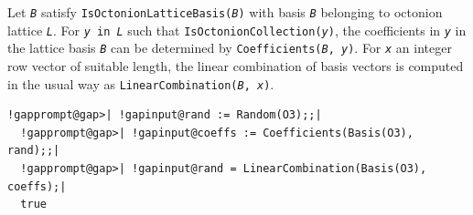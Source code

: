 \documentclass[a4paper,11pt]{report}
\begin{document}
{{{ Let \mbox{\texttt{\mdseries\slshape B}} satisfy \texttt{IsOctonionLatticeBasis(\mbox{\texttt{\mdseries\slshape B}})} with basis \mbox{\texttt{\mdseries\slshape B}} belonging to octonion lattice \mbox{\texttt{\mdseries\slshape L}}. For \texttt{\mbox{\texttt{\mdseries\slshape y}} in \mbox{\texttt{\mdseries\slshape L}}} such that \texttt{IsOctonionCollection(\mbox{\texttt{\mdseries\slshape y}})}, the coefficients in \mbox{\texttt{\mdseries\slshape y}} in the lattice basis \mbox{\texttt{\mdseries\slshape B}} can be determined by \texttt{Coefficients(\mbox{\texttt{\mdseries\slshape B}}, \mbox{\texttt{\mdseries\slshape y}})}. For \texttt{\mbox{\texttt{\mdseries\slshape x}}} an integer row vector of suitable length, the linear combination of basis
vectors is computed in the usual way as \texttt{LinearCombination(\mbox{\texttt{\mdseries\slshape B}}, \mbox{\texttt{\mdseries\slshape x}})}. 
\begin{Verbatim}[commandchars=!@|,fontsize=\small,frame=single,label=Example]
  !gapprompt@gap>| !gapinput@rand := Random(O3);;|
  !gapprompt@gap>| !gapinput@coeffs := Coefficients(Basis(O3), rand);;|
  !gapprompt@gap>| !gapinput@rand = LinearCombination(Basis(O3), coeffs);|
  true
\end{Verbatim}
 }

 }

 }

 
\end{document}
